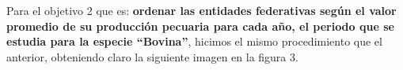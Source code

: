 \item Para el objetivo 2 que es: {\bfseries ordenar las entidades federativas según el valor promedio de su producción pecuaria para cada año, el periodo que se estudia para la especie “Bovina”}, hicimos el mismo procedimiento que el anterior, obteniendo claro la siguiente imagen en la figura 3.